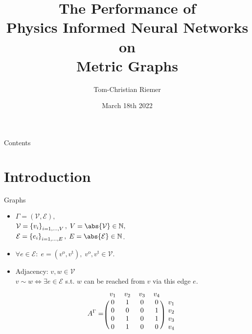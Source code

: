 \documentclass[9pt]{beamer}
\title{The Performance of \\ Physics Informed Neural Networks on \\ Metric Graphs}
\author{Tom-Christian Riemer}
\institute{TU Chemnitz}
\date{March 18th 2022}
\begin{document}
\maketitle

\begin{frame}{Contents}
  \tableofcontents
\end{frame}

\section{Introduction}

\begin{frame}{Graphs}
  \begin{minipage}{0.5\textwidth}
      \begin{itemize}
          \item $\Gamma = \left(\mathcal{V}, \mathcal{E} \right),$ \\ $\mathcal{V} = \left\{ v_i \right\}_{i = 1, \ldots, V}, \; V = \abs{\mathcal{V}} \in \mathbb{N},$ \\
          $\mathcal{E} = \left\{ e_i \right\}_{i = 1, \ldots, E}, \; E = \abs{\mathcal{E}} \in \mathbb{N}$.
          \item $\forall e \in \mathcal{E} \colon \; e = (v^{\operatorname{o}}, v^{\operatorname{t}}), \;v^{\operatorname{o}}, v^{\operatorname{t}} \in \mathcal{V}$.
          \item Adjacency: $v, w \in \mathcal{V}$ \\ $v \sim w \Leftrightarrow \exists e \in \mathcal{E}$ s.t. $w$ can be reached from $v$ via this edge $e$. \\
          \begin{equation*}
            A^{\Gamma} = 
            \begin{blockarray}{ccccc}
                v_1 & v_2 & v_3 & v_4 \\
                \begin{block}{(cccc)c}
                    0 & 1 & 0 & 0 & v_1 \\
                    0 & 0 & 0 & 1 & v_2 \\
                    0 & 1 & 0 & 1 & v_3 \\
                    0 & 1 & 0 & 0 & v_4 \\
                \end{block}
            \end{blockarray}
        \end{equation*}
      \end{itemize}
  \end{minipage} \hfill
  \begin{minipage}{0.45\textwidth}
      \begin{figure}[H]
          \resizebox{45mm}{45mm}
          {
              }
\end{figure}
\end{minipage}
\end{frame}
\end{document}
